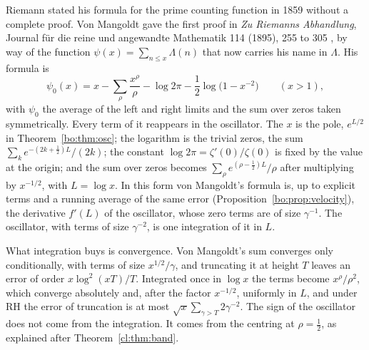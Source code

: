 Riemann stated his formula for the prime counting function in 1859 without a complete proof. Von Mangoldt gave the first proof in \emph{Zu Riemanns Abhandlung}, Journal f\"ur die reine und angewandte Mathematik 114 (1895), 255 to 305 \cite{vonMangoldt95}, by way of the function $\psi(x)=\sum_{n\le x}\Lambda(n)$ that now carries his name in $\Lambda$. His formula is
\[
\psi_0(x)=x-\sum_\rho\frac{x^\rho}{\rho}-\log2\pi-\frac12\log\bigl(1-x^{-2}\bigr)\qquad(x>1),
\]
with $\psi_0$ the average of the left and right limits and the sum over zeros taken symmetrically. Every term of it reappears in the oscillator. The $x$ is the pole, $e^{L/2}$ in Theorem~\ref{bo:thm:osc}; the logarithm is the trivial zeros, the sum $\sum_ke^{-(2k+\frac12)L}/(2k)$; the constant $\log2\pi=\zeta'(0)/\zeta(0)$ is fixed by the value at the origin; and the sum over zeros becomes $\sum_\rho e^{(\rho-\frac12)L}/\rho$ after multiplying by $x^{-1/2}$, with $L=\log x$. In this form von Mangoldt's formula is, up to explicit terms and a running average of the same error (Proposition~\ref{bo:prop:velocity}), the derivative $f'(L)$ of the oscillator, whose zero terms are of size $\gamma^{-1}$. The oscillator, with terms of size $\gamma^{-2}$, is one integration of it in $L$.

What integration buys is convergence. Von Mangoldt's sum converges only conditionally, with terms of size $x^{1/2}/\gamma$, and truncating it at height $T$ leaves an error of order $x\log^2(xT)/T$. Integrated once in $\log x$ the terms become $x^\rho/\rho^2$, which converge absolutely and, after the factor $x^{-1/2}$, uniformly in $L$, and under RH the error of truncation is at most $\sqrt x\sum_{\gamma>T}2\gamma^{-2}$. The sign of the oscillator does not come from the integration. It comes from the centring at $\rho=\frac12$, as explained after Theorem~\ref{cl:thm:band}.

